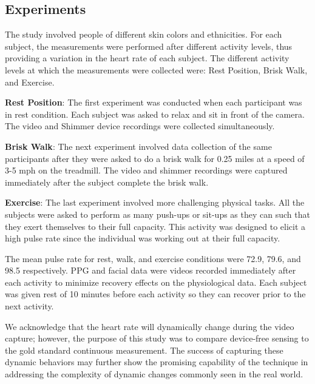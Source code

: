 \subsection{Experiments}
%
%

%

The study involved people of different skin colors and ethnicities. For each subject, the measurements were performed after different activity levels, thus providing a variation in the heart rate of each subject. The different activity levels at which the measurements were collected were:  Rest Position, Brisk Walk, and Exercise.
%


%

\textbf{Rest Position}: The first experiment was conducted when each participant was in rest condition. Each subject was asked to relax and sit in front of the camera. The video and Shimmer device recordings were collected simultaneously.


\textbf{Brisk Walk}: The next experiment involved data collection of the same participants after they were asked to do a brisk walk for 0.25 miles at a speed of 3-5 mph on the treadmill.  The video and shimmer recordings were captured immediately after the subject complete the brisk walk. 

\textbf{Exercise}:  The last experiment involved more challenging physical tasks. All the subjects were asked to perform as many push-ups or sit-ups as they can such that they exert themselves to their full capacity. This activity was designed to elicit a high pulse rate since the individual was working out at their full capacity. 


The mean pulse rate for rest, walk, and exercise conditions were 72.9, 79.6, and 98.5 respectively.  PPG and facial data were videos recorded immediately after each activity to minimize recovery effects on the physiological data. Each subject was given rest of 10 minutes before each activity so they can recover prior to the next activity.


%
%
%

%
We acknowledge that the heart rate will dynamically change during the video capture; however, the purpose of this study was to compare device-free sensing to the gold standard continuous measurement. The success of capturing these dynamic behaviors may further show the promising capability of the technique in addressing the complexity of dynamic changes commonly seen in the real world.